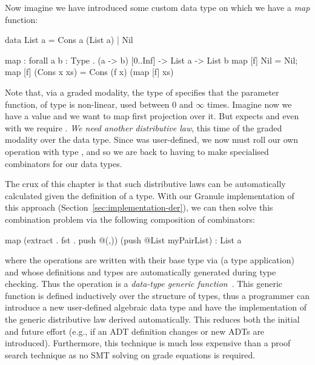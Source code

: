 Now imagine we have introduced some custom data type  on which we
have a \emph{map} function:
%
\begin{granule}
data List a = Cons a (List a) | Nil

map : forall { a b : Type } . (a -> b) [0..Inf] -> List a -> List b
map [f] Nil = Nil;
map [f] (Cons x xs) = Cons (f x) (map [f] xs)
\end{granule}
%
Note that, via a graded modality, the type of  specifies that the
parameter function, of type  is non-linear, used between $0$ and
$\infty$ times. Imagine now we have a value  and we want to map first projection over it. But  expects
 and even with  we require . \emph{We need another distributive law}, this time of the graded modality
over the  data type. Since  was user-defined, we now
must roll our own  operation with type , and so we are back to having to make specialised
combinators for our data types.

The crux of this chapter is that such distributive laws can be automatically
calculated given the definition of a type. With our Granule implementation of
this approach (Section~\ref{sec:implementation-der}), we can then solve this
combination problem via the following composition of combinators:
%
\begin{granule}
map (extract . fst . push @(,)) (push @List myPairList) : List a
\end{granule}
%
where the  operations are written with their base type via
 (a type application) and whose definitions and types are
automatically generated during type checking. Thus the  operation
is a \textit{data-type generic function}~\citep{hinze2000new}. This generic
function is defined inductively over the structure of types, thus a programmer
can introduce a new user-defined algebraic data type and have the implementation
of the generic distributive law derived automatically. This reduces both the
initial and future effort (e.g., if an ADT definition changes or new ADTs are
introduced). Furthermore, this technique is much less expensive than a proof search 
technique as no SMT solving on grade equations is required. 

